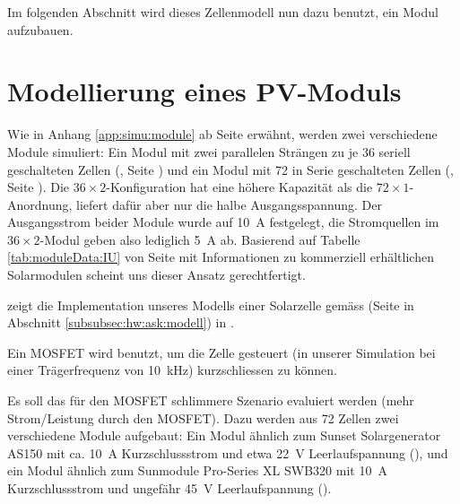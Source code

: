 Im folgenden Abschnitt wird dieses Zellenmodell nun dazu benutzt, ein Modul
aufzubauen.


\clearpage
\section{Modellierung eines PV-Moduls}
\label{sec:simu:model:module}


Wie  in   Anhang  \ref{app:simu:module}  ab   Seite  \pageref{app:simu:module}
erw\"ahnt,     werden     zwei      verschiedene     Module     simuliert: Ein
Modul    mit    zwei    parallelen     Str\"angen    zu    je    36    seriell
geschalteten    Zellen     (,    Seite
\pageref{fig:ltspice:module:cellBased:36x2})    und   ein    Modul   mit    72
in   Serie   geschalteten  Zellen   (,
Seite     \pageref{fig:ltspice:module:cellBased:72x1}). Die     $36     \times
2$-Konfiguration   hat   eine  h\"ohere   Kapazit\"at   als
die   $72  \times   1$-Anordnung,   liefert  daf\"ur   aber   nur  die   halbe
Ausgangsspannung. Der Ausgangsstrom  beider Module wurde  auf \SI{10}{\ampere}
festgelegt,  die Stromquellen  im  $36 \times  2$-Modul  geben also  lediglich
\SI{5}{\ampere}  ab. Basierend auf  Tabelle \ref{tab:moduleData:IU}  von Seite
\pageref{tab:moduleData:IU}  mit Informationen  zu kommerziell  erh\"altlichen
Solarmodulen scheint uns dieser Ansatz gerechtfertigt.

   zeigt   die  Implementation   unseres   Modells
einer     Solarzelle      gem\"ass          (Seite
\pageref{fig:circuit:solarCell} in Abschnitt \ref{subsubsec:hw:ask:modell}) in
.

Ein MOSFET  wird benutzt, um  die Zelle  gesteuert (in unserer  Simulation bei
einer Tr\"agerfrequenz von \SI{10}{\kilo\hertz}) kurzschliessen zu k\"onnen.

Es    soll   das    f\"ur   den    MOSFET   schlimmere    Szenario   evaluiert
werden   (mehr    Strom/Leistung   durch    den   MOSFET). Dazu
werden   aus  72   Zellen  zwei   verschiedene  Module   aufgebaut: Ein  Modul
\"ahnlich    zum    Sunset   Solargenerator    AS150    \cite{ref:solar:as150}
mit    ca. \SI{10}{\ampere}   Kurzschlussstrom    und   etwa    \SI{22}{\volt}
Leerlaufspannung  (),  und  ein  Modul
\"ahnlich  zum Sunmodule  Pro-Series  XL SWB320  \cite{ref:solar:sunmodulePro}
mit   \SI{10}{\ampere}   Kurzschlussstrom    und   ungef\"ahr   \SI{45}{\volt}
Leerlaufspannung ().

